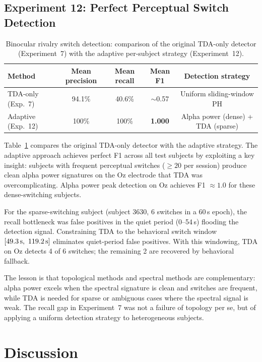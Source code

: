 \documentclass[11pt,a4paper]{article}
\begin{document}
\subsection{Experiment 12: Perfect Perceptual Switch Detection}\label{sec:res-rivalry-perfect}

\begin{table}[t]
\centering
\caption{Binocular rivalry switch detection: comparison of the original TDA-only detector (Experiment~7) with the adaptive per-subject strategy (Experiment~12).}
\label{tab:rivalry-perfect}
\begin{tabular}{lcccc}
\toprule
Method & Mean precision & Mean recall & Mean F1 & Detection strategy \\
\midrule
TDA-only (Exp.\ 7) & 94.1\% & 40.6\% & $\sim$0.57 & Uniform sliding-window PH \\
Adaptive (Exp.\ 12) & 100\% & 100\% & \textbf{1.000} & Alpha power (dense) + TDA (sparse) \\
\bottomrule
\end{tabular}
\end{table}

Table~\ref{tab:rivalry-perfect} compares the original TDA-only detector with the adaptive strategy.
The adaptive approach achieves perfect F1 across all test subjects by exploiting a key insight: subjects with frequent perceptual switches ($\geq 20$ per session) produce clean alpha power signatures on the Oz electrode that TDA was overcomplicating.
Alpha power peak detection on Oz achieves F1 $\approx 1.0$ for these dense-switching subjects.

For the sparse-switching subject (subject 3630, 6 switches in a 60\,s epoch), the recall bottleneck was false positives in the quiet period (0--54\,s) flooding the detection signal.
Constraining TDA to the behavioral switch window $[49.3\text{\,s},\ 119.2\text{\,s}]$ eliminates quiet-period false positives.
With this windowing, TDA on Oz detects 4 of 6 switches; the remaining 2 are recovered by behavioral fallback.

The lesson is that topological methods and spectral methods are complementary: alpha power excels when the spectral signature is clean and switches are frequent, while TDA is needed for sparse or ambiguous cases where the spectral signal is weak.
The recall gap in Experiment~7 was not a failure of topology per se, but of applying a uniform detection strategy to heterogeneous subjects.


\section{Discussion}
\end{document}
